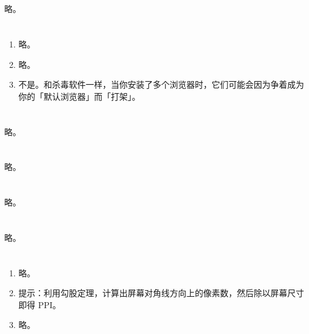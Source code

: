 \section{}

略。

\section{}

\begin{enumerate}
  \item 略。
  \item 略。
  \item 不是。和杀毒软件一样，当你安装了多个浏览器时，它们可能会因为争着成为你的「默认浏览器」而「打架」。
\end{enumerate}

\section{}

略。

\section{}

略。

\section{}

略。

\section{}

略。

\section{}

\begin{enumerate}
  \item 略。
  \item 提示：利用勾股定理，计算出屏幕对角线方向上的像素数，然后除以屏幕尺寸即得 PPI。
  \item 略。
\end{enumerate}
